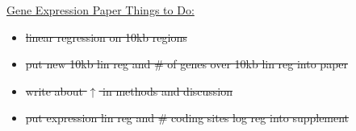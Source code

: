 \documentclass[12pt]{article}
\newcommand{\smel}{\textit{S.\,meliloti}\xspace}
\newcommand{\strep}{\textit{Streptomyces}\xspace}
\newcommand{\bass}{\textit{B.\,subtilis}\xspace}
\newcommand{\ecol}{\textit{E.\,coli}\xspace}
\begin{document}
\underline{Gene Expression Paper Things to Do:}
\begin{itemize}
	
%	
%	
%	
%	
%	
%	
%	
%	
%	
%	
%	
%	
%	
%	
%	
%	
%	
%	
%	
%	
	\item \sout{linear regression on 10kb regions}
	
	\item \sout{put new 10kb lin reg and \# of genes over 10kb lin reg into paper}
	
	\item \sout{write about $\uparrow$ in methods and discussion}
	
	\item \sout{put expression lin reg and \# coding sites log reg into supplement}
	

\end{itemize}
\end{document}
